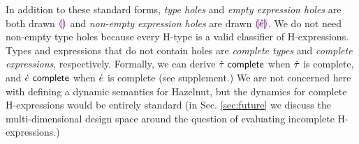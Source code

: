In addition to these standard forms, \emph{type holes} and \emph{empty expression holes} are both drawn $\textcolor{violet}{\llparenthesis}\textcolor{violet}{\rrparenthesis}$ and \emph{non-empty expression holes} are drawn $\hhole{\hexp}$. We do not need non-empty type holes because every H-type is a valid classifier of H-expressions. Types and expressions that do not contain holes are \emph{complete types} and \emph{complete expressions}, respectively. Formally, we can derive $\dot{\tau}~\mathsf{complete}$ when $\dot{\tau}$ is complete, and $\dot{e}~\mathsf{complete}$ when $\dot{e}$ is complete (see supplement.) We are not concerned here with defining a dynamic semantics for Hazelnut, but the dynamics for complete H-expressions would be entirely standard (in Sec. \ref{sec:future} we discuss the multi-dimensional design space around the question of evaluating incomplete H-expressions.)%

